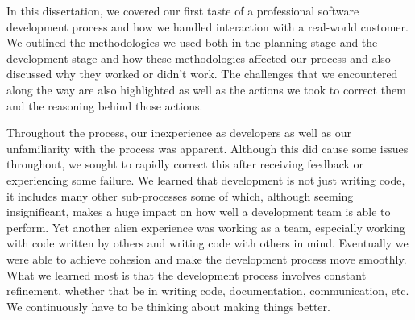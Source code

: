 \documentclass{l3proj}
\begin{document}
In this dissertation, we covered our first taste of a professional software development process and how we handled interaction with a real-world customer. We outlined the methodologies we used both in the planning stage and the development stage and how these methodologies affected our process and also discussed why they worked or didn't work. The challenges that we encountered along the way are also highlighted as well as the actions we took to correct them and the reasoning behind those actions.

Throughout the process, our inexperience as developers as well as our unfamiliarity with the process was apparent. Although this did cause some issues throughout, we sought to rapidly correct this after receiving feedback or experiencing some failure. We learned that development is not just writing code, it includes many other sub-processes some of which, although seeming insignificant, makes a huge impact on how well a development team is able to perform. Yet another alien experience was working as a team, especially working with code written by others and writing code with others in mind. Eventually we were able to achieve cohesion and make the development process move smoothly. What we learned most is that the development process involves constant refinement, whether that be in writing code, documentation, communication, etc. We continuously have to be thinking about making things better. 

%
\printbibliography
\end{document}
